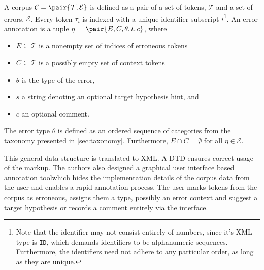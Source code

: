 \documentclass[12pt]{article}
\begin{document}
\begin{definition}\label{def:errorformat}

A corpus $\mathcal{C}=\pair{\mathcal{T},\mathcal{E}}$ is defined as a pair of
a set of tokens, $\mathcal{T}$ and a 
set of errors, $\mathcal{E}$. Every token $\tau_i$ is indexed with a unique
identifier subscript $i$\footnote{Note that the identifier may not consist entirely of
numbers, since it's XML type is \texttt{ID}, which demands identifiers to be
alphanumeric sequences. Furthermore, the identifiers need not adhere to any
particular order, as long as they are unique.}.
An error annotation is a tuple $\eta$ = $\pair{E,C,\theta,t,c}$, where
\begin{itemize}
  \item $E \subseteq \mathcal{T}$ is a nonempty set of indices of erroneous tokens
  \item $C \subseteq \mathcal{T}$ is a possibly empty set of context tokens
  \item $\theta$ is the type of the error,
  \item $s$ a string denoting an optional target hypothesis hint, and
  \item $c$ an optional comment.
\end{itemize}

The error type $\theta$ is defined as an ordered sequence of categories from the
taxonomy presented in \ref{sec:taxonomy}. Furthermore, $E \cap C = \emptyset$
for all $\eta\in\mathcal{E}$.

\end{definition}

This general data structure is translated to XML. A DTD ensures correct usage of
the markup. The authors also designed a graphical user interface based
annotation tool\footnotemark which hides the implementation details of the
corpus data from the user and enables a rapid annotation process. The user marks
tokens from the corpus as erroneous, assigns them a type, possibly an error
context and suggest a target hypothesis or records a comment entirely via the
interface.


\end{document}
